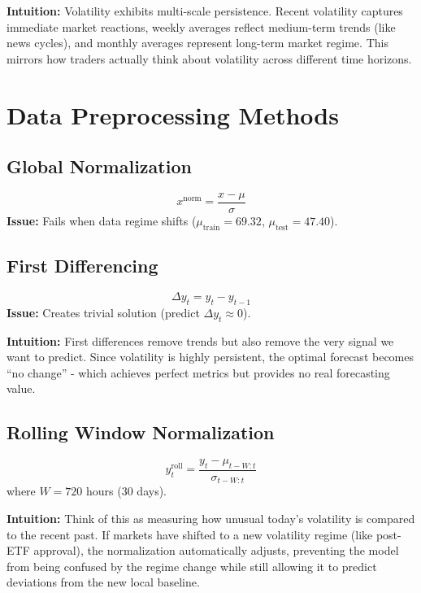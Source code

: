 \documentclass{article}
\begin{document}
\textbf{Intuition:} Volatility exhibits multi-scale persistence. Recent volatility captures immediate market reactions, weekly averages reflect medium-term trends (like news cycles), and monthly averages represent long-term market regime. This mirrors how traders actually think about volatility across different time horizons.

\section{Data Preprocessing Methods}

\subsection{Global Normalization}
\begin{equation}
x^{\text{norm}} = \frac{x - \mu}{\sigma}
\end{equation}
\textbf{Issue:} Fails when data regime shifts ($\mu_{\text{train}} = 69.32$, $\mu_{\text{test}} = 47.40$).

\subsection{First Differencing}
\begin{equation}
\Delta y_t = y_t - y_{t-1}
\end{equation}
\textbf{Issue:} Creates trivial solution (predict $\Delta y_t \approx 0$).

\textbf{Intuition:} First differences remove trends but also remove the very signal we want to predict. Since volatility is highly persistent, the optimal forecast becomes ``no change'' - which achieves perfect metrics but provides no real forecasting value.

\subsection{Rolling Window Normalization}
\begin{equation}
y^{\text{roll}}_t = \frac{y_t - \mu_{t-W:t}}{\sigma_{t-W:t}}
\end{equation}
where $W = 720$ hours (30 days).

\textbf{Intuition:} Think of this as measuring how unusual today's volatility is compared to the recent past. If markets have shifted to a new volatility regime (like post-ETF approval), the normalization automatically adjusts, preventing the model from being confused by the regime change while still allowing it to predict deviations from the new local baseline.
\end{document}
